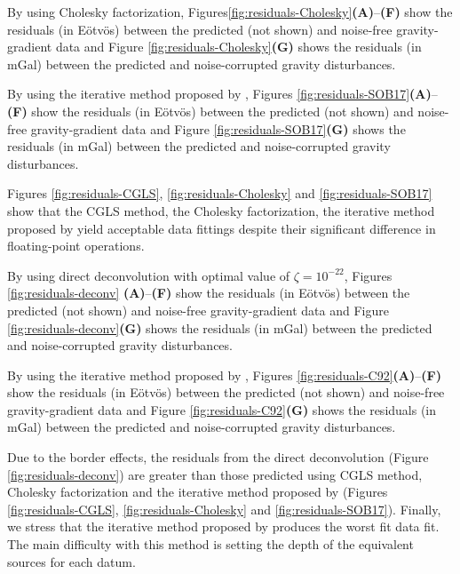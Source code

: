 \documentclass[utf8]{frontiers_suppmat} %
\begin{document}
By using Cholesky factorization, Figures\ref{fig:residuals-Cholesky}\textbf{(A)}--\textbf{(F)} 
show the residuals (in Eötvös) between the predicted (not shown) and noise-free gravity-gradient data 
and Figure \ref{fig:residuals-Cholesky}\textbf{(G)} shows the residuals (in mGal) between the predicted and noise-corrupted gravity disturbances.

By using the iterative method proposed by \citet{siqueira-etal2017}, 
Figures \ref{fig:residuals-SOB17}\textbf{(A)}--\textbf{(F)}  show  the residuals (in Eötvös) between the predicted (not shown) and 
noise-free gravity-gradient data and Figure \ref{fig:residuals-SOB17}\textbf{(G)} shows the residuals (in mGal) between the predicted 
and noise-corrupted gravity disturbances.

Figures \ref{fig:residuals-CGLS}, \ref{fig:residuals-Cholesky}  and \ref{fig:residuals-SOB17} 
show that the CGLS method, the Cholesky factorization, the iterative method proposed by 
\citet{siqueira-etal2017} yield acceptable data fittings despite their 
significant difference in floating-point operations. 

By using direct deconvolution with optimal value of $\zeta = 10^{-22}$, 
Figures \ref{fig:residuals-deconv} \textbf{(A)}--\textbf{(F)} show the residuals (in Eötvös) between 
the predicted (not shown) and noise-free gravity-gradient data and Figure \ref{fig:residuals-deconv}\textbf{(G)} shows the residuals (in mGal) between the predicted and noise-corrupted gravity disturbances.


By using the iterative method  proposed by \cite{cordell1992}, 
Figures \ref{fig:residuals-C92}\textbf{(A)}--\textbf{(F)}  show  the residuals (in Eötvös) between the predicted 
(not shown) and noise-free gravity-gradient data and Figure \ref{fig:residuals-C92}\textbf{(G)} 
shows the residuals (in mGal) between the predicted and noise-corrupted gravity disturbances.

Due to the border effects, the residuals from the direct deconvolution 
(Figure \ref{fig:residuals-deconv}) are greater than those predicted using 
CGLS method, Cholesky factorization and the iterative method proposed 
by \citet{siqueira-etal2017} (Figures \ref{fig:residuals-CGLS}, 
\ref{fig:residuals-Cholesky}  and \ref{fig:residuals-SOB17}).
Finally, we stress that the iterative method  proposed by \cite{cordell1992}  produces 
the worst fit data fit. The main difficulty with this method is setting the depth of the
equivalent sources for each datum.
\end{document}
